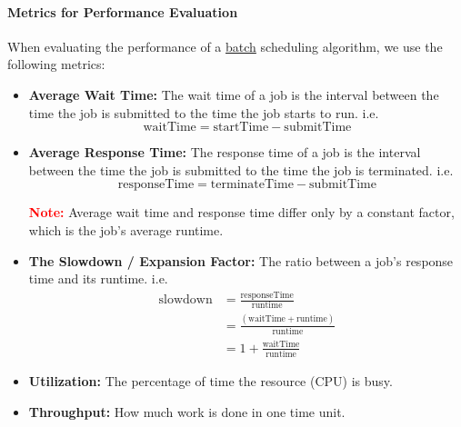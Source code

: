 \documentclass[openany,12pt]{book}
\newcommand{\red}[1]{\textcolor{Red}{#1}}
\begin{document}
\paragraph{Metrics for Performance Evaluation}
When evaluating the performance of a \underline{batch} scheduling algorithm, we use the following metrics:
\begin{itemize}
    \item \textbf{Average Wait Time:} The wait time of a job is the interval between the time the job is submitted to the time the job starts to run. i.e.
          \begin{equation*}
              \text{waitTime} = \text{startTime} - \text{submitTime}
          \end{equation*}

    \item \textbf{Average Response Time:} The response time of a job is the interval between the time the job is submitted to the time the job is terminated. i.e.
          \begin{equation*}
              \text{responseTime} = \text{terminateTime} - \text{submitTime}
          \end{equation*}

          \red{\textbf{Note:}} Average wait time and response time differ only by a constant factor, which is the job's average runtime.

    \item \textbf{The Slowdown / Expansion Factor:} The ratio between a job's response time and its runtime. i.e.
          \begin{equation*}
              \begin{aligned}
                  \text{slowdown} & = \frac{\text{responseTime}}{\text{runtime}}                \\
                                  & = \frac{(\text{waitTime} + \text{runtime})}{\text{runtime}} \\
                                  & = 1 + \frac{\text{waitTime}}{\text{runtime}}
              \end{aligned}
          \end{equation*}

    \item \textbf{Utilization:} The percentage of time the resource (CPU) is busy.

    \item \textbf{Throughput:} How much work is done in one time unit.
\end{itemize}
\end{document}

